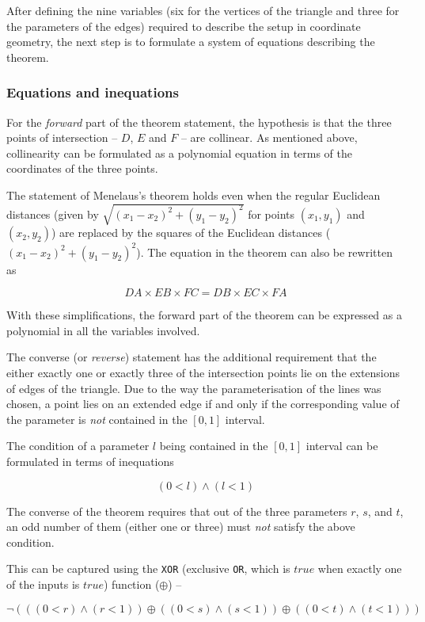 \documentclass{amsart}
\theoremstyle{plain}
\theoremstyle{definition}
\theoremstyle{remark}
\begin{document}
After defining the nine variables (six for the vertices of the triangle and three for the parameters of the edges) required to describe the setup in coordinate geometry, the next step is to formulate a system of equations describing the theorem.

\subsubsection{Equations and inequations}

For the \emph{forward} part of the theorem statement, the hypothesis is that the three points of intersection -- \(D\), \(E\) and \(F\) -- are collinear. As mentioned above, collinearity can be formulated as a polynomial equation in terms of the coordinates of the three points.

The statement of Menelaus's theorem holds even when the regular Euclidean distances (given by $\sqrt{(x_1 - x_2)^2 + (y_1 - y_2)^2}$ for points $(x_1, y_1)$ and $(x_2, y_2)$) are replaced by the squares of the Euclidean distances ($(x_1 - x_2)^2 + (y_1 - y_2)^2$). The equation in the theorem can also be rewritten as

$$
	DA \times EB \times FC = DB \times EC \times FA
$$

With these simplifications, the forward part of the theorem can be expressed as a polynomial in all the variables involved.

The converse (or \emph{reverse}) statement has the additional requirement that the either exactly one or exactly three of the intersection points lie on the extensions of edges of the triangle. Due to the way the parameterisation of the lines was chosen, a point lies on an extended edge if and only if the corresponding value of the parameter is \emph{not} contained in the \(\left[0, 1\right]\) interval.

The condition of a parameter $l$ being contained in the \(\left[0, 1\right]\) interval can be formulated in terms of inequations

$$
	(0 < l) \wedge (l < 1)
$$

The converse of the theorem requires that out of the three parameters \(r\), \(s\), and \(t\), an odd number of them (either one or three) must \emph{not} satisfy the above condition.

This can be captured using the \texttt{XOR} (exclusive \texttt{OR}, which is $true$ when exactly one of the inputs is $true$) function ($\oplus$) --

$$
	\neg \left( \left( (0 < r) \wedge (r < 1) \right) \oplus \left( (0 < s) \wedge (s < 1) \right) \oplus \left( (0 < t) \wedge (t < 1) \right) \right)
$$
\end{document}
